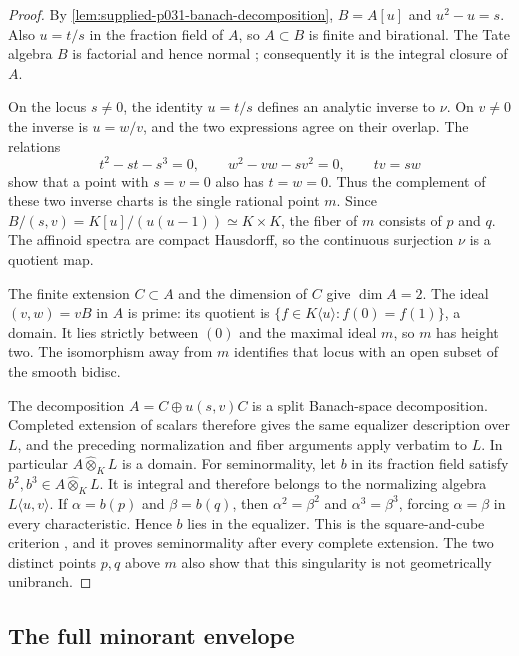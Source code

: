 \begin{proof}
By \cref{lem:supplied-p031-banach-decomposition}, $B=A[u]$ and $u^2-u=s$. Also $u=t/s$ in the fraction field of $A$, so $A\subset B$ is finite and birational. The Tate algebra $B$ is factorial and hence normal \cite[Theorem~5.4]{JonssonHorawa20}; consequently it is the integral closure of $A$.

On the locus $s\neq0$, the identity $u=t/s$ defines an analytic inverse to $\nu$. On $v\neq0$ the inverse is $u=w/v$, and the two expressions agree on their overlap. The relations
\[
 t^2-st-s^3=0,\qquad w^2-vw-sv^2=0,\qquad tv=sw
\]
show that a point with $s=v=0$ also has $t=w=0$. Thus the complement of these two inverse charts is the single rational point $m$. Since $B/(s,v)=K[u]/(u(u-1))\simeq K\times K$, the fiber of $m$ consists of $p$ and $q$. The affinoid spectra are compact Hausdorff, so the continuous surjection $\nu$ is a quotient map.

The finite extension $C\subset A$ and the dimension of $C$ give $\dim A=2$. The ideal $(v,w)=vB$ in $A$ is prime: its quotient is $\{f\in K\langle u\rangle:f(0)=f(1)\}$, a domain. It lies strictly between $(0)$ and the maximal ideal $m$, so $m$ has height two. The isomorphism away from $m$ identifies that locus with an open subset of the smooth bidisc.

The decomposition $A=C\oplus u(s,v)C$ is a split Banach-space decomposition. Completed extension of scalars therefore gives the same equalizer description over $L$, and the preceding normalization and fiber arguments apply verbatim to $L$. In particular $A\widehat\otimes_K L$ is a domain. For seminormality, let $b$ in its fraction field satisfy $b^2,b^3\in A\widehat\otimes_K L$. It is integral and therefore belongs to the normalizing algebra $L\langle u,v\rangle$. If $\alpha=b(p)$ and $\beta=b(q)$, then $\alpha^2=\beta^2$ and $\alpha^3=\beta^3$, forcing $\alpha=\beta$ in every characteristic. Hence $b$ lies in the equalizer. This is the square-and-cube criterion \cite[Definition~29.48.1, \href{https://stacks.math.columbia.edu/tag/0EUL}{Tag~0EUL}]{StacksProject}, and it proves seminormality after every complete extension. The two distinct points $p,q$ above $m$ also show that this singularity is not geometrically unibranch.
\end{proof}

\subsection{The full minorant envelope}\label{sec:supplied-p031-envelope}

